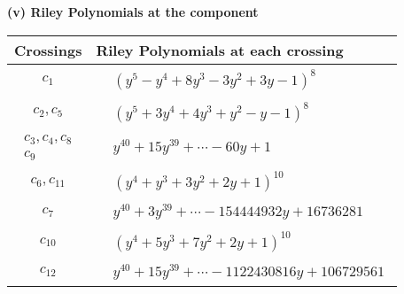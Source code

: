 \documentclass[1p]{elsarticle_modified}
\theoremstyle{definition}
\begin{document}
\flushleft \textbf{(v) Riley Polynomials at the component}\newline \\
\begin{tabular}{m{50pt}|m{274pt}}
Crossings & \hspace{64pt}Riley Polynomials at each crossing \\
\hline $$\begin{aligned}c_{1}\end{aligned}$$&$\begin{aligned}
&(y^5- y^4+8 y^3-3 y^2+3 y-1)^8
\end{aligned}$\\
\hline $$\begin{aligned}c_{2},c_{5}\end{aligned}$$&$\begin{aligned}
&(y^5+3 y^4+4 y^3+y^2- y-1)^8
\end{aligned}$\\
\hline $$\begin{aligned}c_{3},c_{4},c_{8}\\c_{9}\end{aligned}$$&$\begin{aligned}
&y^{40}+15 y^{39}+\cdots-60 y+1
\end{aligned}$\\
\hline $$\begin{aligned}c_{6},c_{11}\end{aligned}$$&$\begin{aligned}
&(y^4+y^3+3 y^2+2 y+1)^{10}
\end{aligned}$\\
\hline $$\begin{aligned}c_{7}\end{aligned}$$&$\begin{aligned}
&y^{40}+3 y^{39}+\cdots-154444932 y+16736281
\end{aligned}$\\
\hline $$\begin{aligned}c_{10}\end{aligned}$$&$\begin{aligned}
&(y^4+5 y^3+7 y^2+2 y+1)^{10}
\end{aligned}$\\
\hline $$\begin{aligned}c_{12}\end{aligned}$$&$\begin{aligned}
&y^{40}+15 y^{39}+\cdots-1122430816 y+106729561
\end{aligned}$\\
\hline
\end{tabular}\\~\\
\end{document}
